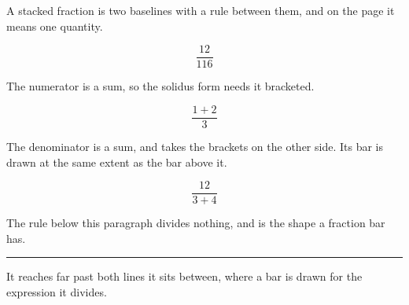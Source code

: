 \documentclass{article}
\begin{document}
A stacked fraction is two baselines with a rule between them, and on the page it means one
quantity.

\[ \frac{12}{116} \]

The numerator is a sum, so the solidus form needs it bracketed.

\[ \frac{1 + 2}{3} \]

The denominator is a sum, and takes the brackets on the other side. Its bar is drawn at the
same extent as the bar above it.

\[ \frac{12}{3 + 4} \]

The rule below this paragraph divides nothing, and is the shape a fraction bar has.

\noindent\rule{\linewidth}{0.4pt}

It reaches far past both lines it sits between, where a bar is drawn for the expression it
divides.
\end{document}

